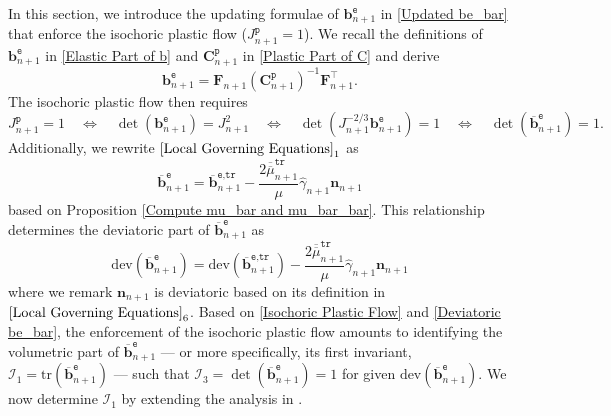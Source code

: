 \documentclass[preprint,11pt]{elsarticle}
\theoremstyle{definition}
\begin{document}
In this section, we introduce the updating formulae of $\mathbf{b}_{n+1}^\texttt{e}$ in \eqref{Updated be_bar} that enforce the isochoric plastic flow ($J_{n+1}^\texttt{p} = 1$). We recall the definitions of $\mathbf{b}_{n+1}^\texttt{e}$ in \eqref{Elastic Part of b} and $\mathbf{C}_{n+1}^\texttt{p}$ in \eqref{Plastic Part of C} and derive
\begin{equation*}
    \mathbf{b}_{n+1}^\texttt{e} = \mathbf{F}_{n+1} (\mathbf{C}_{n+1}^\texttt{p})^{-1} \mathbf{F}_{n+1}^\top.
\end{equation*}
The isochoric plastic flow then requires
\begin{equation} \label{Isochoric Plastic Flow}
    J_{n+1}^\texttt{p} = 1
    \quad \Longleftrightarrow \quad
    \det(\mathbf{b}_{n+1}^\texttt{e}) = J_{n+1}^2
    \quad \Longleftrightarrow \quad
    \det \left( J_{n+1}^{-2/3} \mathbf{b}_{n+1}^\texttt{e} \right) = 1
    \quad \Longleftrightarrow \quad
    \det \left( \overline{\mathbf{b}}_{n+1}^\texttt{e} \right) = 1.
\end{equation}
Additionally, we rewrite $\eqref{Local Governing Equations}_1$ as
\begin{equation*}
    \overline{\mathbf{b}}_{n+1}^\texttt{e}
    = \overline{\mathbf{b}}_{n+1}^\texttt{e,tr}
    - \dfrac{2 \overline{\overline{\mu}}_{n+1}^\texttt{tr}}{\mu} \widehat{\gamma}_{n+1} \mathbf{n}_{n+1}
\end{equation*}
based on Proposition \ref{Compute mu_bar and mu_bar_bar}. This relationship determines the deviatoric part of $\overline{\mathbf{b}}_{n+1}^\texttt{e}$ as
\begin{equation} \label{Deviatoric be_bar}
    \text{dev} \left( \overline{\mathbf{b}}_{n+1}^\texttt{e} \right) = \text{dev} \left( \overline{\mathbf{b}}_{n+1}^\texttt{e,tr} \right) - \dfrac{2 \overline{\overline{\mu}}_{n+1}^\texttt{tr}}{\mu} \widehat{\gamma}_{n+1} \mathbf{n}_{n+1}
\end{equation}
where we remark $\mathbf{n}_{n+1}$ is deviatoric based on its definition in $\eqref{Local Governing Equations}_6$. Based on \eqref{Isochoric Plastic Flow} and \eqref{Deviatoric be_bar}, the enforcement of the isochoric plastic flow amounts to identifying the volumetric part of $\overline{\mathbf{b}}_{n+1}^\texttt{e}$ --- or more specifically, its first invariant, $\mathcal{I}_1 = \text{tr} (\overline{\mathbf{b}}_{n+1}^\texttt{e})$ --- such that $\mathcal{I}_3 = \det(\overline{\mathbf{b}}_{n+1}^\texttt{e}) = 1$ for given $\text{dev} (\overline{\mathbf{b}}_{n+1}^\texttt{e})$. We now determine $\mathcal{I}_1$ by extending the analysis in \citet{simo_associative_1992}.
\end{document}
